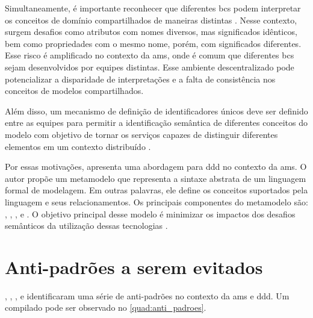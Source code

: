 Simultaneamente, é importante reconhecer que diferentes \acrshort{bc}s podem interpretar os conceitos de domínio compartilhados de maneiras distintas \cite{Diepenbrock20171777}. Nesse contexto, surgem desafios como atributos com nomes diversos, mas significados idênticos, bem como propriedades com o mesmo nome, porém, com significados diferentes. Esse risco é amplificado no contexto da \acrshort{ams}, onde é comum que diferentes \acrshort{bc}s sejam desenvolvidos por equipes distintas. Esse ambiente descentralizado pode potencializar a disparidade de interpretações e a falta de consistência nos conceitos de modelos compartilhados.

Além disso, um mecanismo de definição de identificadores únicos deve ser definido entre as equipes para permitir a identificação semântica de diferentes conceitos do modelo com objetivo de tornar os serviços capazes de distinguir diferentes elementos em um contexto distribuído \cite{Diepenbrock20171777}.

Por essas motivações,  apresenta uma abordagem para \acrshort{ddd} no contexto da \acrshort{ams}. O autor propõe um metamodelo que representa a sintaxe abstrata de um linguagem formal de modelagem. Em outras palavras, ele define os conceitos suportados pela linguagem e seus relacionamentos. Os principais componentes do metamodelo são: , , ,  e . O objetivo principal desse modelo é minimizar os impactos dos desafios semânticos da utilização dessas tecnologias \cite{Diepenbrock20171777}.

\section{Anti-padrões a serem evitados}
, , ,  e  identificaram uma série de anti-padrões no contexto da \acrshort{ams} e \acrshort{ddd}. Um compilado pode ser observado no \autoref{quad:anti_padroes}.

